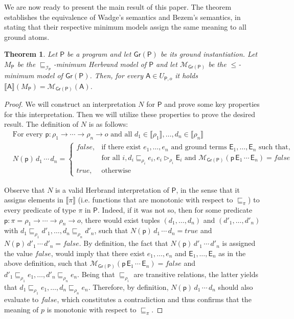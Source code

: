\documentclass[submission,copyright]{eptcs}
\newtheorem{theorem}{Theorem}
\theoremstyle{definition}
\newcommand{\mo}[1]{\llbracket#1\rrbracket}
\newcommand{\mwrt}[2]{\llbracket#1\rrbracket(#2)}
\newcommand{\aleq}[1][]{\sqsubseteq_{#1}}
\newcommand{\ee}[1][I]{\rhd_{#1}}
\newcommand{\bezem}{\mathcal{M}_\mathsf{Gr(P)}}
\begin{document}
{We are now ready to present the main result of this paper. The theorem
establishes the equivalence of Wadge's semantics and Bezem's semantics, in
stating that their respective minimum models assign the same meaning to all ground atoms.}
\begin{theorem}
Let $\mathsf{P}$ be a program and let $\mathsf{Gr(P)}$ be its ground instantiation.
Let $M_\mathsf{P}$ be the $\aleq[\mathcal{I}_\mathsf{P}]$-minimum Herbrand model of $\mathsf{P}$ and let $\bezem$ be the
$\leq$-minimum model of $\mathsf{Gr(P)}$. Then, for every $\mathsf{A} \in U_{\mathsf{P},o}$
it holds $\mwrt{\mathsf{A}}{M_\mathsf{P}} = \bezem(\mathsf{A})$.
\end{theorem}
\begin{proof}


We will construct an interpretation $N$ for $\mathsf{P}$ and prove
some key properties for this interpretation. Then we will utilize these properties
to prove the desired result. The definition of $N$ is as follows:
\begin{align*}
& \mbox{For every } \mathsf{p} : \rho_1 \rightarrow \cdots \rightarrow \rho_n \rightarrow o \mbox{ and all } d_1 \in \mo{\rho_1}, \ldots, d_n \in \mo{\rho_n}\\
& N(\mathsf{p})\,d_1\,\cdots\,d_n =
   \begin{cases}
    \mathit{false},  & \mbox{if there exist } e_1, \ldots, e_n \mbox{ and ground terms } \mathsf{E}_1,\ldots,\mathsf{E}_n \mbox{ such that,} \\
            & \mbox{for all } i, d_i  \aleq[\rho_i] e_i, e_i \ee[\rho_i] \mathsf{E}_i \mbox{ and } \bezem(\mathsf{p}\, \mathsf{E}_1 \, \cdots \, \mathsf{E}_n)=\mathit{false}\\
    true,   & \mbox{otherwise}
   \end{cases}
\end{align*}


Observe that $N$ is a valid Herbrand interpretation of $\mathsf{P}$, in the sense
that it assigns elements in $\mo{\pi}$ (i.e. functions that are monotonic with
respect to $\aleq[\pi]$) to every predicate of type $\pi$ in $\mathsf{P}$. Indeed,
if it was not so, then for some predicate $\mathsf{p} : \pi= \rho_1 \rightarrow \cdots \rightarrow \rho_n \rightarrow o$,
there would exist tuples $(d_1, \ldots, d_n)$ and $(d'_1, \ldots, d'_n)$ with
$d_1 \aleq[\rho_1] d'_1, \ldots, d_n \aleq[\rho_n] d'_n$, such that
$N(\mathsf{p})\,d_1\,\cdots\,d_n = true$ and $N(\mathsf{p})\,d'_1\,\cdots\,d'_n = \mathit{false}$.
By definition, the fact that $N(\mathsf{p})\,d'_1\,\cdots\,d'_n$ is assigned the value
$\mathit{false}$, would imply that there exist $e_1, \ldots, e_n$ and $\mathsf{E}_1,\ldots,\mathsf{E}_n$
as in the above definition, such that $\bezem(\mathsf{p}\, \mathsf{E}_1 \, \cdots \, \mathsf{E}_n)=\mathit{false}$ and
$d'_1 \aleq[\rho_1] e_1, \ldots, d'_n \aleq[\rho_n] e_n$. Being that $\aleq[\rho_i]$
are transitive relations, the latter yields that
$d_1 \aleq[\rho_1] e_1, \ldots, d_n \aleq[\rho_n] e_n$. Therefore, by definition,
$N(\mathsf{p})\,d_1\,\cdots\,d_n$ should also evaluate to $\mathit{false}$, which constitutes a
contradiction and thus confirms that the meaning of $p$ is monotonic with respect to $\aleq[\pi]$.


\end{proof}
\end{document}
